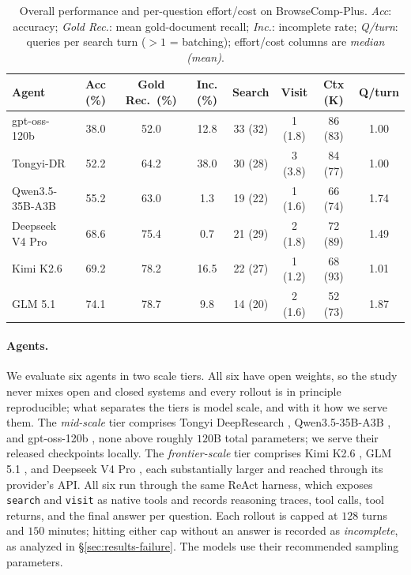 \begin{table}[t]
\centering
\small
\caption{Overall performance and per-question effort/cost on BrowseComp-Plus. \emph{Acc}: accuracy; \emph{Gold Rec.}: mean gold-document recall; \emph{Inc.}: incomplete rate; \emph{Q/turn}: queries per search turn ($>1$ = batching); effort/cost columns are \emph{median (mean)}.}
\label{tab:overall}
\begin{tabular}{lccccccc}
\toprule
Agent & Acc (\%) & Gold Rec.\ (\%) & Inc. (\%) & Search & Visit & Ctx (K) & Q/turn \\
\midrule
gpt-oss-120b           & 38.0 & 52.0 & 12.8 & 33 (32) & 1 (1.8) & 86 (83) & 1.00 \\
Tongyi-DR              & 52.2 & 64.2 & 38.0 & 30 (28) & 3 (3.8) & 84 (77) & 1.00 \\
Qwen3.5-35B-A3B        & 55.2 & 63.0 &  1.3 & 19 (22) & 1 (1.6) & 66 (74) & 1.74 \\
\midrule
Deepseek V4 Pro        & 68.6 & 75.4 &  0.7 & 21 (29) & 2 (1.8) & 72 (89) & 1.49 \\
Kimi K2.6              & 69.2 & 78.2 & 16.5 & 22 (27) & 1 (1.2) & 68 (93) & 1.01 \\
GLM 5.1                & 74.1 & 78.7 &  9.8 & 14 (20) & 2 (1.6) & 52 (73) & 1.87 \\
\bottomrule
\end{tabular}
\end{table}

\paragraph{Agents.} We evaluate six agents in two scale tiers. All six have open weights, so the study never mixes open and closed systems and every rollout is in principle reproducible; what separates the tiers is model scale, and with it how we serve them. The \emph{mid-scale} tier comprises Tongyi DeepResearch \citep{Team2025TongyiDeepResearchTechnical}, Qwen3.5-35B-A3B \citep{qwen2025qwen3}, and gpt-oss-120b \citep{openai2025gptoss}, none above roughly $120$B total parameters; we serve their released checkpoints locally. The \emph{frontier-scale} tier comprises Kimi K2.6 \citep{kimi2026k26}, GLM 5.1 \citep{zeng2026glm}, and Deepseek V4 Pro \citep{deepseekai2026deepseekv4}, each substantially larger and reached through its provider's API. All six run through the same ReAct harness, which exposes \texttt{search} and \texttt{visit} as native tools and records reasoning traces, tool calls, tool returns, and the final answer per question. Each rollout is capped at $128$ turns and $150$ minutes; hitting either cap without an answer is recorded as \emph{incomplete}, as analyzed in §\ref{sec:results-failure}. The models use their recommended sampling parameters.

